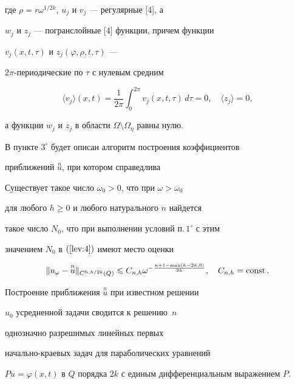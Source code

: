 где $\rho=r\omega^{1/2k}$, $u_j$ и $v_j$ --- регулярные [4], а


$w_j$ и $z_j$ --- погранслойные [4] функции, причем функции


$v_j(x,t,\tau)$ и $z_j(\varphi,\rho,t,\tau)$ ---


$2\pi$-периодические по $\tau$ с нулевым средним


$$


\langle v_j \rangle(x,t)=\frac{1}{2\pi}


\int_0^{2\pi} v_j(x,t,\tau)\,d\tau=0,\quad


\langle z_j\rangle=0,


$$


а функции $w_j$ и $z_j$  в области $\Omega\setminus


\Omega_\eta$ равны нулю.





В пункте $3^\circ$ будет описан алгоритм построения коэффициентов


приближений $\overset{n}{u}{}$, при котором справедлива





\begin{thmnonum}


Существует такое число $\omega_0>0$, что при $\omega>\omega_0$ 


для любого $h\geqslant 0$ и любого натурального $n$ найдется


такое число $N_0$, что при выполнении условий п.\,$1^\circ$ с этим


значением $N_0$ в $(\ref{lev:4})$ имеют место оценки


$$


\|u_\omega-\overset{n}{u}{}\|_{C^{h,h/2k}(Q)}\leqslant


C_{n,h} \omega^{-\frac{n+1-\max(h-2k,0)}{2k}},\quad


C_{n,h}=\const.


$$


Построение приближения $\overset{n}{u}{}$ при известном решении


$u_0$ усредненной задачи сводится к решению~$n$


однозначно разрешимых линейных первых


начально-краевых задач для параболических уравнений 


$Pu=\varphi(x,t)$ в $Q$ порядка $2k$ с единым дифференциальным выражением $P$.


\end{thmnonum}





